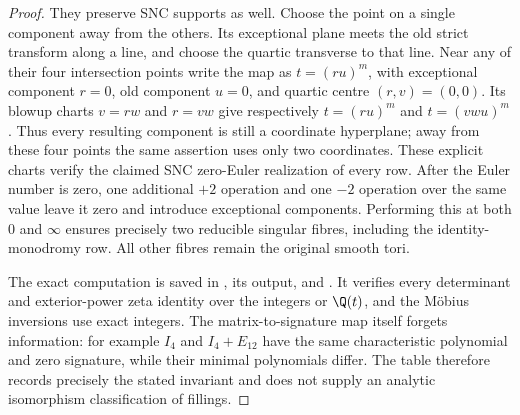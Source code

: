 \begin{proof}
They preserve SNC supports as well. Choose
the point on a single component away from
the others. Its exceptional plane meets
the old strict transform along a line,
and choose the quartic transverse to that
line. Near any of their four intersection
points write the map as $t=(ru)^m$,
with exceptional component $r=0$, old
component $u=0$, and quartic centre
$(r,v)=(0,0)$. Its blowup charts
$v=rw$ and $r=vw$ give respectively
$t=(ru)^m$ and $t=(vwu)^m$.
Thus every resulting component is still
a coordinate hyperplane; away from these
four points the same assertion uses only
two coordinates. These explicit charts
verify the claimed SNC zero-Euler
realization of every row.
After the Euler number is zero, one additional
$+2$ operation and one $-2$ operation over the
same value leave it zero and introduce
exceptional components. Performing this at
both $0$ and $\infty$ ensures precisely two
reducible singular fibres, including the
identity-monodromy row. All other fibres
remain the original smooth tori.

The exact computation is saved in
, its
output, and
.
It verifies every determinant and exterior-power
zeta identity over the integers or $\Q(t)$,
and the M\"obius inversions use exact integers.
The matrix-to-signature map itself forgets
information: for example $I_4$ and
$I_4+E_{12}$ have the same characteristic
polynomial and zero signature, while their
minimal polynomials differ. The table therefore
records precisely the stated invariant and
does not supply an analytic isomorphism
classification of fillings.
\end{proof}
